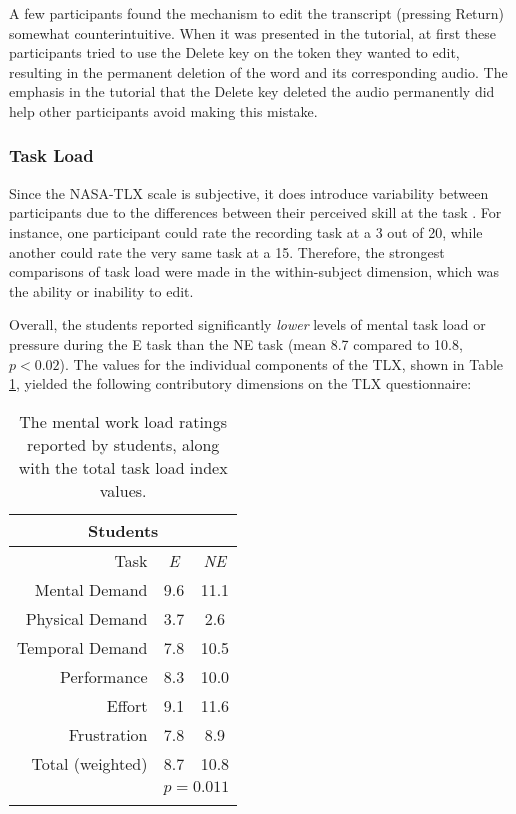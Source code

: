 A few participants found the mechanism to edit the transcript (pressing Return) somewhat counterintuitive. 
When it was presented in the tutorial, at first these participants tried to use the Delete key on the token they wanted to edit, resulting in the permanent deletion of the word and its corresponding audio. 
The emphasis in the tutorial that the Delete key deleted the audio permanently did help other participants avoid making this mistake.

\subsubsection{Task Load}
Since the NASA-TLX scale is subjective, it does introduce variability between participants due to the differences between their perceived skill at the task \cite{nasatlx}. 
For instance, one participant could rate the recording task at a 3 out of 20, while another could rate the very same task at a 15.
Therefore, the strongest comparisons of task load were made in the within-subject dimension, which was the ability or inability to edit.

Overall, the students reported significantly \emph{lower} levels of mental task load or pressure during the E task than the NE task (mean 8.7 compared to 10.8, $p<0.02$). 
The values for the individual components of the TLX, shown in Table \ref{tab:table1}, yielded the following contributory dimensions on the TLX questionnaire:

\begin{table}
	\centering
	\begin{tabular}{r c c}
		\multicolumn{3}{c}{\textbf{Students}} \\
		\toprule
		Task			& \textit{E} & \textit{NE} \\
		Mental Demand   & 9.6      & 11.1      \\
		Physical Demand & 3.7      & 2.6       \\
		Temporal Demand & 7.8      & 10.5      \\
		Performance     & 8.3      & 10.0      \\
		Effort          & 9.1      & 11.6      \\
		Frustration     & 7.8      & 8.9       \\
		\midrule
		Total (weighted)& 8.7 & 10.8 \\
		& \multicolumn{2}{c}{$p=0.011$} \\
		\bottomrule \\
	\end{tabular}
	\caption{The mental work load ratings reported by students, along with the total task load index values.}~\label{tab:table1}
\end{table}

